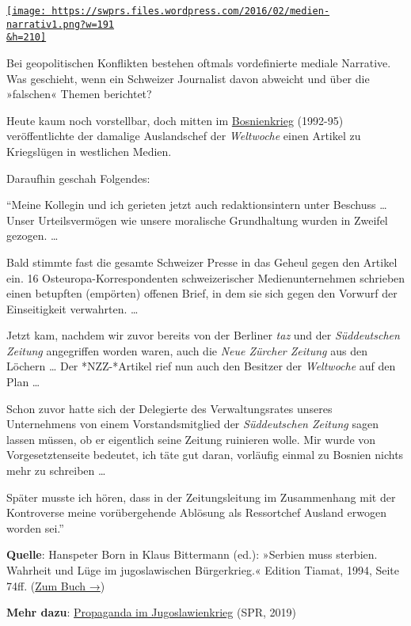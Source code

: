 \href{https://swprs.files.wordpress.com/2016/02/medien-narrativ1.png}{\texttt{[image: https://swprs.files.wordpress.com/2016/02/medien-narrativ1.png?w=191\\\&h=210]}}

Bei geopolitischen Konflikten bestehen oftmals vor­de­fi­nierte mediale
Narrative. Was geschieht, wenn ein Schweizer Jour­na­list davon abweicht
und über die »falschen« Themen be­richtet?

Heute kaum noch vorstellbar, doch mitten im
\href{https://de.wikipedia.org/wiki/Bosnienkrieg}{Bosnienkrieg}
(1992-95) veröffentlichte der damalige Auslandschef der \emph{Weltwoche}
einen Artikel zu Kriegslügen in westlichen Medien.

Daraufhin geschah Folgendes:

``Meine Kollegin und ich gerieten jetzt auch redaktions­intern unter
Beschuss \ldots{} Unser Urteils­vermögen wie unsere moralische
Grund­haltung wurden in Zweifel gezogen. \ldots{}

Bald stimmte fast die gesamte Schweizer Presse in das Geheul gegen den
Artikel ein. 16 Osteuropa-Korrespondenten schweizerischer
Medien­unternehmen schrieben einen betupften (empörten) offenen Brief,
in dem sie sich gegen den Vorwurf der Einseitigkeit verwahrten. \ldots{}

Jetzt kam, nachdem wir zuvor bereits von der Berliner \emph{taz} und der
\emph{Süddeutschen Zeitung} angegriffen worden waren, auch die
\emph{Neue Zürcher Zeitung} aus den Löchern \ldots{} Der *NZZ-*Artikel
rief nun auch den Besitzer der \emph{Welt­woche} auf den Plan \ldots{}

Schon zuvor hatte sich der Delegierte des Verwaltungs­rates unseres
Unternehmens von einem Vorstands­mitglied der \emph{Süddeutschen
Zeitung} sagen lassen müssen, ob er eigentlich seine Zeitung ruinieren
wolle. Mir wurde von Vorgesetzten­seite bedeutet, ich täte gut daran,
vorläufig einmal zu Bosnien nichts mehr zu schreiben \ldots{}

Später musste ich hören, dass in der Zeitungs­leitung im Zusammen­hang
mit der Kontroverse meine vorüber­gehende Ablösung als Ressort­chef
Ausland erwogen worden sei.''

\textbf{Quelle}: Hanspeter Born in Klaus Bittermann (ed.): »Serbien muss
sterbien. Wahrheit und Lüge im jugo­slawischen Bürger­krieg.« Edition
Tiamat, 1994, Seite 74ff.
(\href{https://edition-tiamat.de/serbien-muss-sterbien/}{Zum Buch →})

\textbf{Mehr dazu}:
\href{https://swprs.org/propaganda-im-jugoslawienkrieg/}{Propaganda im
Jugoslawienkrieg} (SPR, 2019)

